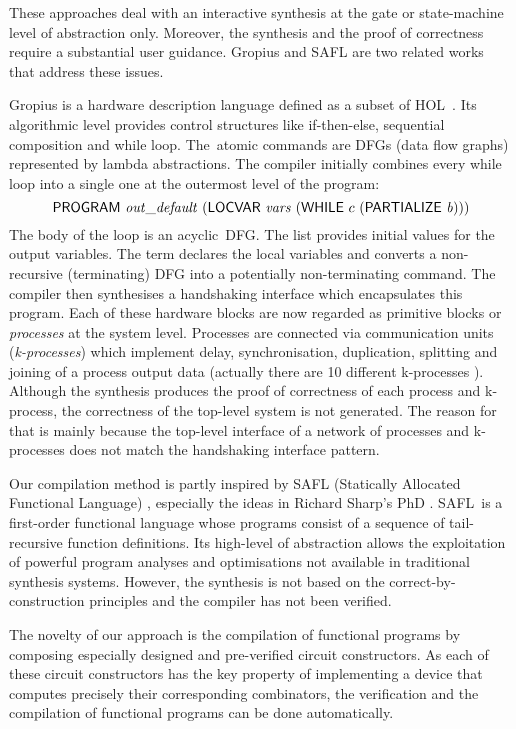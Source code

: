 \documentclass{llncs}
\begin{document}
These approaches deal with an interactive
synthesis at the gate or state-machine level
of abstraction only. Moreover, the synthesis
and the proof of correctness require a 
substantial user guidance. Gropius and SAFL 
are two related works that address these issues.

Gropius is a hardware description language
defined as a subset of HOL~\mbox{\cite{Blu01,Gropius1}}.
Its algorithmic level
provides control structures like if-then-else,
sequential composition and while loop.
The~atomic commands are DFGs (data flow
graphs) represented by lambda abstractions.
The compiler initially combines every while loop into
a single one at the outermost level of the
program:
\[
\DEF{PROGRAM}\ \VAR{out\_default}\ (\DEF{LOCVAR}\ \VAR{vars}\ 
(\DEF{WHILE}\ c\ (\DEF{PARTIALIZE}\ \VAR{b})))
\]
The body  of the  loop is an acyclic~DFG.
The list 
provides initial values for the output variables.
The term  declares the local variables
 and  converts a
non-recursive (terminating) DFG into a potentially
non-terminating command.
The compiler then synthesises a handshaking
interface which encapsulates this program.
Each of these hardware blocks are now regarded
as primitive blocks or {\em processes\/} at the system level.
Processes are connected via communication
units ({\em k-processes\/}) which implement delay,
synchronisation, duplication,
splitting and joining of a process output data
(actually there  are 10 different k-processes \cite{Blu01}).
Although the synthesis produces the proof of
correctness of each process and k-process,
the correctness of the top-level system is not generated.
The reason for that is mainly because
the top-level interface of a network of processes and 
k-processes does not match the handshaking interface pattern.

Our compilation method is partly inspired by SAFL 
(Statically Allocated Functional Language) \cite{MS01b},
especially the ideas in Richard Sharp's PhD \cite{Sha02}. 
SAFL~is a first-order functional language whose
programs consist of a sequence of tail-recursive function 
definitions. Its high-level of abstraction allows
the exploitation of powerful program analyses
and optimisations not available in traditional
synthesis systems. 
However, the synthesis is not based on
the correct-by-construction principles
and the compiler has not been verified.

The novelty of our approach is the 
compilation of functional programs by
composing especially designed and
pre-verified circuit constructors.
%
As each of these circuit constructors
has the key property of implementing
a device that computes precisely their
corresponding combinators, 
the verification and the compilation of 
functional programs can be done
automatically.
\end{document}
